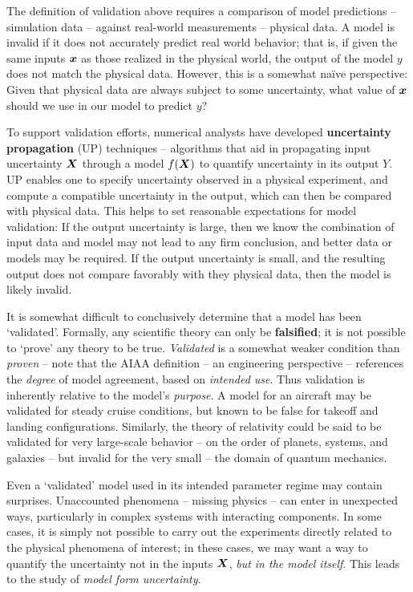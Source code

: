 \documentclass[../primer.tex]{subfiles}
\begin{document}
The definition of validation above requires a comparison of model predictions --
simulation data -- against real-world measurements -- physical data. A model is
invalid if it does not accurately predict real world behavior; that is, if given
the same inputs $\boldsymbol{x}$ as those realized in the physical world, the output of the
model $y$ does not match the physical data. However, this is a somewhat na\"ive
perspective: Given that physical data are always subject to some uncertainty,
what value of $\boldsymbol{x}$ should we use in our model to predict $y$?

To support validation efforts, numerical analysts have developed
\textbf{uncertainty propagation} (UP) techniques -- algorithms that aid in
propagating input uncertainty $\boldsymbol{X}$ through a model $f(\boldsymbol{X})$ to quantify
uncertainty in its output $Y$. UP enables one to specify uncertainty observed in
a physical experiment, and compute a compatible uncertainty in the output, which
can then be compared with physical data. This helps to set reasonable
expectations for model validation: If the output uncertainty is large, then we
know the combination of input data and model may not lead to any firm
conclusion, and better data or models may be required. If the output uncertainty
is small, and the resulting output does not compare favorably with they physical
data, then the model is likely invalid.

It is somewhat difficult to conclusively determine that a model has been
`validated'. Formally, any scientific theory can only be \textbf{falsified}; it
is not possible to `prove' any theory to be true.\cite{popper2005logic}
\emph{Validated} is a somewhat weaker condition than \emph{proven} -- note that
the AIAA definition -- an engineering perspective -- references the
\emph{degree} of model agreement, based on \emph{intended use}. Thus validation
is inherently relative to the model's \emph{purpose}. A model for an aircraft
may be validated for steady cruise conditions, but known to be false for takeoff
and landing configurations. Similarly, the theory of relativity could be said to
be validated for very large-scale behavior -- on the order of planets, systems,
and galaxies -- but invalid for the very small -- the domain of quantum
mechanics.

Even a `validated' model used in its intended parameter regime may contain
surprises. Unaccounted phenomena -- missing physics -- can enter in unexpected
ways, particularly in complex systems with interacting components. In some
cases, it is simply not possible to carry out the experiments directly related
to the physical phenomena of interest; in these cases, we may want a way to
quantify the uncertainty not in the inputs $\boldsymbol{X}$, \emph{but in the model
  itself}. This leads to the study of \emph{model form uncertainty}.
\end{document}
